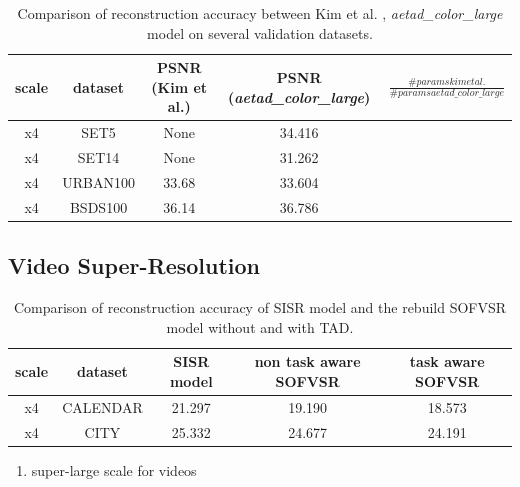 \begin{table}[!htbp]
	\begin{center}
	\begin{tabular}{c|c|c|c|c}
	scale & dataset & PSNR (Kim et al.)
	& PSNR (\textit{aetad\_color\_large}) & $\frac{\# params kim et al.}{\# params aetad\_color\_large}$  \\
	\hline
  x4 & SET5 & None & 34.416 \\
	x4 & SET14 & None & 31.262 \\
	x4 & URBAN100 & 33.68 & 33.604 \\
	x4 & BSDS100 & 36.14 & 36.786 \\
	\end{tabular}
	\caption{Comparison of reconstruction accuracy between Kim et al. \cite{TAID},
	\textit{aetad\_color\_large} model on several validation datasets. }
	\label{table:icperformance}
	\end{center}
\end{table}

\subsection{Video Super-Resolution}
\label{sec:Experiments_VSR}

\begin{table}[!htbp]
	\begin{center}
	\begin{tabular}{c|c|c|c|c}
	scale & dataset & \ac{SISR} model & non task aware SOFVSR
	& task aware SOFVSR \\
	\hline
  x4 & CALENDAR & 21.297 & 19.190 & 18.573 \\
	x4 & CITY & 25.332 & 24.677 & 24.191 \\
	\end{tabular}
	\caption{Comparison of reconstruction accuracy of \ac{SISR} model and
	the rebuild SOFVSR model without and with \ac{TAD}.}
	\label{table:vsrperformance}
	\end{center}
\end{table}


\begin{enumerate}
\item super-large scale for videos
\end{enumerate}

